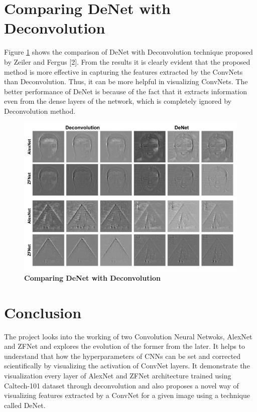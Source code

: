 \documentclass{article} %
\begin{document}
	\section{Comparing DeNet with Deconvolution}
	Figure \ref{denet_comp} shows the comparison of DeNet with Deconvolution technique proposed by Zeiler and Fergus [2]. From the results it is clearly evident that the proposed method is more effective in capturing the features extracted by the ConvNets than Deconvolution. Thus, it can be more helpful in visualizing ConvNets. The better performance of DeNet is because of the fact that it extracts information even from the dense layers of the network, which is completely ignored by Deconvolution method. 
	
	\begin{figure}[!htb]
		\centering
		\includegraphics[width=14cm]{Images/DeNetComp.png}
		\caption{\textbf{Comparing DeNet with Deconvolution}}
		\label{denet_comp}
	\end{figure}
	
	\section{Conclusion}
	The project looks into the working of two Convolution Neural Netwoks, AlexNet and ZFNet and explores the evolution of the former from the later. It helps to understand that how the hyperparameters of CNNs can be set and corrected scientifically by visualizing the activation of ConvNet layers. It demonstrate the visualization every layer of AlexNet and ZFNet architecture trained using Caltech-101 dataset through deconvolution and also proposes a novel way of visualizing features extracted by a ConvNet for a given image using a technique called DeNet.
	
\end{document}
